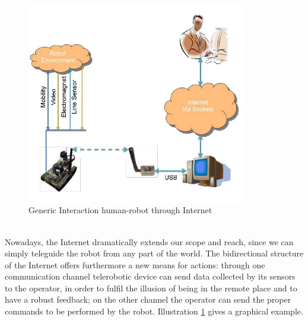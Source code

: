 \begin{figure}
  \begin{center}
    \includegraphics[width=270pt]{img/user_robot_inter.jpg}
    \caption{Generic Interaction human-robot through Internet}
    \label{fig:user_robot_inter}
  \end{center}
\end{figure}
\\
Nowadays, the Internet dramatically extends our scope and reach, since we can simply
teleguide the robot from any part of the world. The bidirectional
structure of the Internet offers furthermore a new means for actions:
through one communication channel telerobotic device can send data
collected by its sensors to the operator, in order to fulfil the
illusion of being in the remote place and to have a robust feedback;
on the other channel the operator can send the proper commands to
be performed by the robot. Illustration \ref{fig:user_robot_inter}
gives a graphical example.
